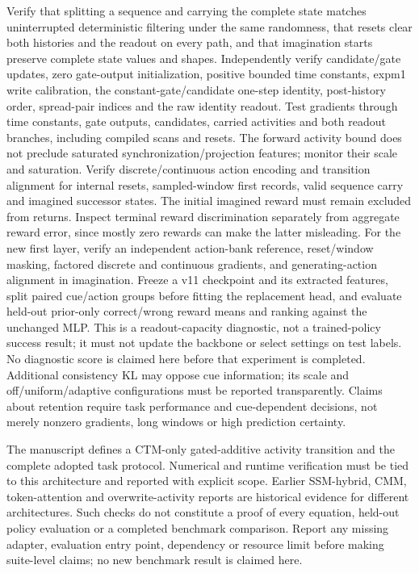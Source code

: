 \documentclass{article}
\begin{document}
Verify that splitting a sequence and carrying the complete state matches uninterrupted deterministic filtering under the same randomness, that resets clear both histories and the readout on every path, and that imagination starts preserve complete state values and shapes. Independently verify candidate/gate updates, zero gate-output initialization, positive bounded time constants, expm1 write calibration, the constant-gate/candidate one-step identity, post-history order, spread-pair indices and the raw identity readout. Test gradients through time constants, gate outputs, candidates, carried activities and both readout branches, including compiled scans and resets. The forward activity bound does not preclude saturated synchronization/projection features; monitor their scale and saturation. Verify discrete/continuous action encoding and transition alignment for internal resets, sampled-window first records, valid sequence carry and imagined successor states. The initial imagined reward must remain excluded from returns. Inspect terminal reward discrimination separately from aggregate reward error, since mostly zero rewards can make the latter misleading. For the new first layer, verify an independent action-bank reference, reset/window masking, factored discrete and continuous gradients, and generating-action alignment in imagination. Freeze a v11 checkpoint and its extracted features, split paired cue/action groups before fitting the replacement head, and evaluate held-out prior-only correct/wrong reward means and ranking against the unchanged MLP. This is a readout-capacity diagnostic, not a trained-policy success result; it must not update the backbone or select settings on test labels. No diagnostic score is claimed here before that experiment is completed. Additional consistency KL may oppose cue information; its scale and off/uniform/adaptive configurations must be reported transparently. Claims about retention require task performance and cue-dependent decisions, not merely nonzero gradients, long windows or high prediction certainty.

The manuscript defines a CTM-only gated-additive activity transition and the complete adopted task protocol. Numerical and runtime verification must be tied to this architecture and reported with explicit scope. Earlier SSM-hybrid, CMM, token-attention and overwrite-activity reports are historical evidence for different architectures. Such checks do not constitute a proof of every equation, held-out policy evaluation or a completed benchmark comparison. Report any missing adapter, evaluation entry point, dependency or resource limit before making suite-level claims; no new benchmark result is claimed here.
\end{document}
